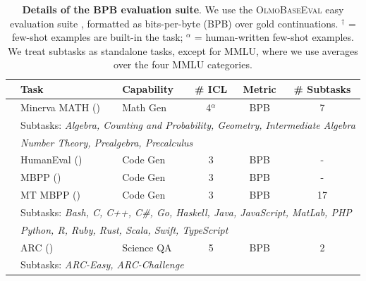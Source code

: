 \begin{table}[t]
  \centering
  \caption{
  \textbf{Details of the BPB evaluation suite}. 
  We use the \textsc{OlmoBaseEval} easy evaluation suite \citep{olmo2025olmo3}, formatted as bits-per-byte (BPB) over gold continuations. $^\dagger$ = few-shot examples are built-in the task; $^\alpha$ = human-written few-shot examples. We treat subtasks as standalone tasks, except for MMLU, where we use averages over the four MMLU categories. 
  }
\begin{scriptsize}
\begin{tabular}{lllccc}
\toprule
& \bf{Task} & \bf{Capability} & \bf{\# ICL} & \bf{Metric} & \bf{\# Subtasks} \\
\midrule

\rowcolor{ai2offwhite} & Minerva MATH (\citeyear{lewkowycz2022solving}) & Math Gen & 4$^\alpha$ & BPB & 7 \\
\rowcolor{ai2offwhite} & \multicolumn{5}{l}{\hspace{6pt}Subtasks: \textit{Algebra, Counting and Probability, Geometry, Intermediate Algebra} } \\
\rowcolor{ai2offwhite}\rowcolor{ai2offwhite} \multirow{-3}{*}{\rotatebox[origin=c]{90}{\textit{Math}}} & \multicolumn{5}{l}{\hspace{6pt}\textit{Number Theory, Prealgebra, Precalculus} } \\
\rowcolor{lightgrey} & HumanEval (\citeyear{chen2021codex}) & Code Gen & 3 & BPB & - \\
\rowcolor{lightgrey} & MBPP (\citeyear{austin2021program}) & Code Gen & 3 & BPB & - \\
\rowcolor{lightgrey} & MT MBPP (\citeyear{cassano2022multipl, olmo2025olmo3}) & Code Gen & 3 & BPB & 17 \\
\rowcolor{lightgrey} & \multicolumn{5}{l}{\hspace{6pt}Subtasks: \textit{Bash, C, C++, C\#, Go, Haskell, Java, JavaScript, MatLab, PHP} } \\
\rowcolor{lightgrey}\multirow{-5}{*}{\rotatebox[origin=c]{90}{\textit{Code}}} & \multicolumn{5}{l}{\hspace{6pt}\textit{Python, R, Ruby, Rust, Scala, Swift, TypeScript} } \\
\rowcolor{ai2offwhite} & ARC (\citeyear{clark2018think}) & Science QA & 5 & BPB & 2 \\
\rowcolor{ai2offwhite} & \multicolumn{5}{l}{\hspace{6pt}Subtasks: \textit{ARC-Easy, ARC-Challenge} } \\

\end{tabular}
\end{scriptsize}
\end{table}
